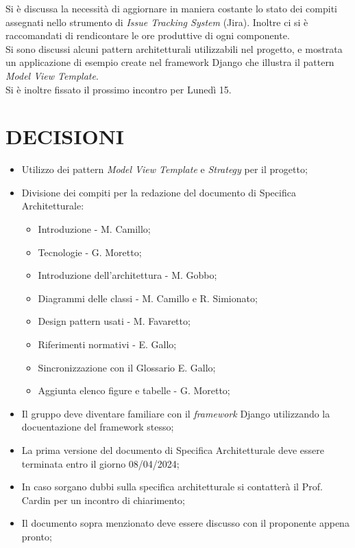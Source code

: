 \documentclass[5pt]{article}
\begin{document}
Si è discussa la necessità di aggiornare in maniera costante lo stato dei compiti assegnati nello strumento di\textit{ Issue Tracking System} (Jira). Inoltre ci si è raccomandati di rendicontare le ore produttive di ogni componente. \\
Si sono discussi alcuni pattern architetturali utilizzabili nel progetto, e mostrata un applicazione di esempio create nel framework Django che illustra il pattern \textit{Model View Template}. \\
Si è inoltre fissato il prossimo incontro per Lunedì 15.

\section{DECISIONI}
\begin{itemize}
	\item Utilizzo dei pattern \textit{Model View Template} e \textit{Strategy} per il progetto;
	\item Divisione dei compiti per la redazione del documento di Specifica Architetturale:
		\begin{itemize}
			\item Introduzione - M. Camillo;
			\item Tecnologie - G. Moretto;
			\item Introduzione dell'architettura - M. Gobbo;
			\item Diagrammi delle classi - M. Camillo e R. Simionato;
			\item Design pattern usati - M. Favaretto;
			\item Riferimenti normativi - E. Gallo;
			\item Sincronizzazione con il Glossario E. Gallo;
			\item Aggiunta elenco figure e tabelle - G. Moretto;
		\end{itemize}
	\item Il gruppo deve diventare familiare con il \textit{framework} Django utilizzando la docuentazione del framework stesso;
	\item La prima versione del documento di Specifica Architetturale deve essere terminata entro il giorno 08/04/2024;
	\item In caso sorgano dubbi sulla specifica architetturale si contatterà il Prof. Cardin per un incontro di chiarimento;
	\item Il documento sopra menzionato deve essere discusso con il proponente appena pronto;
\end{itemize}
\end{document}
